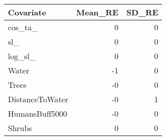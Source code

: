 \begin{tabular}{lrr}
  \toprule
Covariate & Mean\_RE & SD\_RE \\ 
  \midrule
cos\_ta\_ & 0 & 0 \\ 
  sl\_ & 0 & 0 \\ 
  log\_sl\_ & 0 & 0 \\ 
  Water & -1 & 0 \\ 
  Trees & -0 & 0 \\ 
  DistanceToWater & -0 & 1 \\ 
  HumansBuff5000 & -0 & 0 \\ 
  Shrubs & 0 & 0 \\ 
   \bottomrule
\end{tabular}
